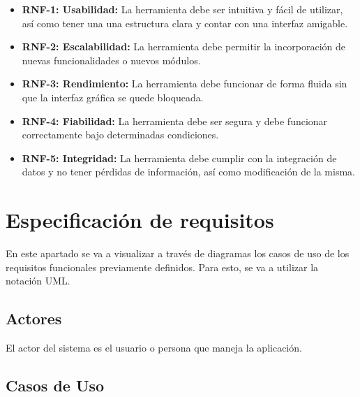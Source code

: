 \begin{itemize}
\item
\textbf{RNF-1: Usabilidad:} La herramienta debe ser intuitiva y fácil de utilizar, así como tener una una estructura clara y contar con una interfaz amigable.
\item
\textbf{RNF-2: Escalabilidad:} La herramienta debe permitir la incorporación de nuevas funcionalidades o nuevos módulos. 
\item
\textbf{RNF-3: Rendimiento:} La herramienta debe funcionar de forma fluida sin que la interfaz gráfica se quede bloqueada.
\item
\textbf{RNF-4: Fiabilidad:} La herramienta debe ser segura y debe funcionar correctamente bajo determinadas condiciones.  
\item
\textbf{RNF-5: Integridad:} La herramienta debe cumplir con la integración de datos y no tener pérdidas de información, así como modificación de la misma. 

\end{itemize}
\newpage


\section{Especificación de requisitos}
En este apartado se va a visualizar a través de diagramas los casos de uso de los requisitos funcionales previamente definidos. Para esto, se va a utilizar la notación UML.

\subsection{Actores}
El actor del sistema es el usuario o persona que maneja la aplicación.


\subsection{Casos de Uso}

